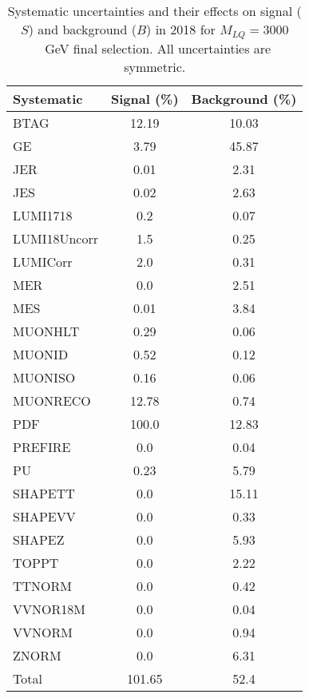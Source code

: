 \begin{table}[htbp]
\begin{center}
\caption{Systematic uncertainties and their effects on signal ($S$) and background ($B$) in 2018 for $M_{LQ}=3000$~GeV final selection. All uncertainties are symmetric.}
\begin{tabular}{lcc}
\hline\hline
Systematic & Signal (\%) & Background (\%) \\ \hline 
BTAG & 12.19 & 10.03\\ 
GE & 3.79 & 45.87\\ 
JER & 0.01 & 2.31\\ 
JES & 0.02 & 2.63\\ 
LUMI1718 & 0.2 & 0.07\\ 
LUMI18Uncorr & 1.5 & 0.25\\ 
LUMICorr & 2.0 & 0.31\\ 
MER & 0.0 & 2.51\\ 
MES & 0.01 & 3.84\\ 
MUONHLT & 0.29 & 0.06\\ 
MUONID & 0.52 & 0.12\\ 
MUONISO & 0.16 & 0.06\\ 
MUONRECO & 12.78 & 0.74\\ 
PDF & 100.0 & 12.83\\ 
PREFIRE & 0.0 & 0.04\\ 
PU & 0.23 & 5.79\\ 
SHAPETT & 0.0 & 15.11\\ 
SHAPEVV & 0.0 & 0.33\\ 
SHAPEZ & 0.0 & 5.93\\ 
TOPPT & 0.0 & 2.22\\ 
TTNORM & 0.0 & 0.42\\ 
VVNOR18M & 0.0 & 0.04\\ 
VVNORM & 0.0 & 0.94\\ 
ZNORM & 0.0 & 6.31\\ 
Total & 101.65 & 52.4\\ \hline \hline
\end{tabular}
\label{tab:SysUncertainties_uujj_3000}
\end{center}
\end{table}

